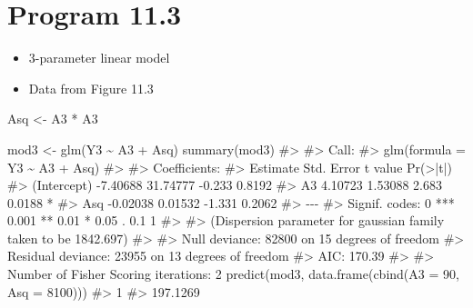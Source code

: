 \documentclass[
  10pt,
  a4paper,
]{book}
\newenvironment{Shaded}{\begin{snugshade}}{\end{snugshade}}
\newcommand{\AttributeTok}[1]{\textcolor[rgb]{0.40,0.45,0.13}{#1}}
\newcommand{\CommentTok}[1]{\textcolor[rgb]{0.37,0.37,0.37}{#1}}
\newcommand{\DecValTok}[1]{\textcolor[rgb]{0.68,0.00,0.00}{#1}}
\newcommand{\FunctionTok}[1]{\textcolor[rgb]{0.28,0.35,0.67}{#1}}
\newcommand{\NormalTok}[1]{\textcolor[rgb]{0.00,0.46,0.62}{#1}}
\newcommand{\OtherTok}[1]{\textcolor[rgb]{0.00,0.46,0.62}{#1}}
\newcommand{\SpecialCharTok}[1]{\textcolor[rgb]{0.37,0.37,0.37}{#1}}
\providecommand{\tightlist}{%
  \setlength{\itemsep}{0pt}\setlength{\parskip}{0pt}}
\begin{document}
\section{Program 11.3}\label{program-11.3}

\begin{itemize}
\tightlist
\item
  3-parameter linear model
\item
  Data from Figure 11.3
\end{itemize}

\begin{Shaded}
\begin{Highlighting}[]
\NormalTok{Asq }\OtherTok{\textless{}{-}}\NormalTok{ A3 }\SpecialCharTok{*}\NormalTok{ A3}

\NormalTok{mod3 }\OtherTok{\textless{}{-}} \FunctionTok{glm}\NormalTok{(Y3 }\SpecialCharTok{\textasciitilde{}}\NormalTok{ A3 }\SpecialCharTok{+}\NormalTok{ Asq)}
\FunctionTok{summary}\NormalTok{(mod3)}
\CommentTok{\#\textgreater{} }
\CommentTok{\#\textgreater{} Call:}
\CommentTok{\#\textgreater{} glm(formula = Y3 \textasciitilde{} A3 + Asq)}
\CommentTok{\#\textgreater{} }
\CommentTok{\#\textgreater{} Coefficients:}
\CommentTok{\#\textgreater{}             Estimate Std. Error t value Pr(\textgreater{}|t|)  }
\CommentTok{\#\textgreater{} (Intercept) {-}7.40688   31.74777  {-}0.233   0.8192  }
\CommentTok{\#\textgreater{} A3           4.10723    1.53088   2.683   0.0188 *}
\CommentTok{\#\textgreater{} Asq         {-}0.02038    0.01532  {-}1.331   0.2062  }
\CommentTok{\#\textgreater{} {-}{-}{-}}
\CommentTok{\#\textgreater{} Signif. codes:  0 \textquotesingle{}***\textquotesingle{} 0.001 \textquotesingle{}**\textquotesingle{} 0.01 \textquotesingle{}*\textquotesingle{} 0.05 \textquotesingle{}.\textquotesingle{} 0.1 \textquotesingle{} \textquotesingle{} 1}
\CommentTok{\#\textgreater{} }
\CommentTok{\#\textgreater{} (Dispersion parameter for gaussian family taken to be 1842.697)}
\CommentTok{\#\textgreater{} }
\CommentTok{\#\textgreater{}     Null deviance: 82800  on 15  degrees of freedom}
\CommentTok{\#\textgreater{} Residual deviance: 23955  on 13  degrees of freedom}
\CommentTok{\#\textgreater{} AIC: 170.39}
\CommentTok{\#\textgreater{} }
\CommentTok{\#\textgreater{} Number of Fisher Scoring iterations: 2}
\FunctionTok{predict}\NormalTok{(mod3, }\FunctionTok{data.frame}\NormalTok{(}\FunctionTok{cbind}\NormalTok{(}\AttributeTok{A3 =} \DecValTok{90}\NormalTok{, }\AttributeTok{Asq =} \DecValTok{8100}\NormalTok{)))}
\CommentTok{\#\textgreater{}        1 }
\CommentTok{\#\textgreater{} 197.1269}
\end{Highlighting}
\end{Shaded}
\end{document}
